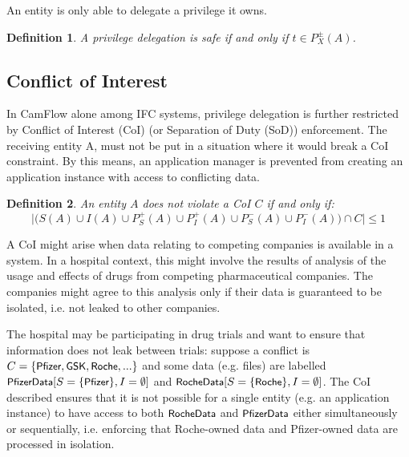 \documentclass[10pt,journal,compsoc]{IEEEtran}
\newtheorem{definition}{Definition}
\begin{document}
An entity is only able to delegate a privilege it owns. 

\begin{definition}
\label{def:privilege_deleg}
A privilege delegation is safe if and only if $t \in P_X^\pm(A)$.
\end{definition}

\subsection{Conflict of Interest}
\label{sec:model:coi}

In CamFlow alone among IFC systems, privilege delegation is further restricted by Conflict of Interest (CoI) (or Separation of Duty (SoD)) enforcement. The receiving entity A, must not be put in a situation where it would break a CoI constraint. By this means, an application manager is prevented from creating an application instance with access to conflicting data.

\begin{definition}
\label{def:coi}
An entity $A$ does not violate a CoI $C$ if and only if:
\small
\begin{equation*}
\Big|\Big(S(A) \cup I(A) \cup P^+_S(A) \cup P^+_I(A) \cup P^-_S(A) \cup P^-_I(A)\Big) \cap C\Big| \leq 1
\label{sec:ifc_model:ifc_rule6}
\end{equation*}
\normalsize
\end{definition}


A CoI might arise when data relating to competing companies is available in a system. In a hospital context, this might involve the results of analysis of the usage and effects of drugs from competing pharmaceutical companies. The companies might agree to this analysis only if their data is guaranteed to be isolated, i.e. not leaked to other companies. 

The hospital may be participating in drug trials and want to ensure that information does not leak between trials: 
suppose a conflict is 
$C=\{ \textsf{\small Pfizer}, \textsf{\small GSK}, \textsf{\small Roche}, ...\}$ 
and some data (e.g. files) are labelled $\textsf{\small PfizerData}[S=\{ \textsf{\small Pfizer}\}, I=\emptyset]$ and $\textsf{\small RocheData}[S=\{\textsf{\small Roche}\}, I=\emptyset]$. 
The CoI described ensures that it is not possible for a single entity (e.g. an application instance) to have access to both $\textsf{\small RocheData}$ and $\textsf{\small PfizerData}$ either simultaneously or sequentially, i.e. enforcing that Roche-owned data and Pfizer-owned data are processed in isolation.
\end{document}
